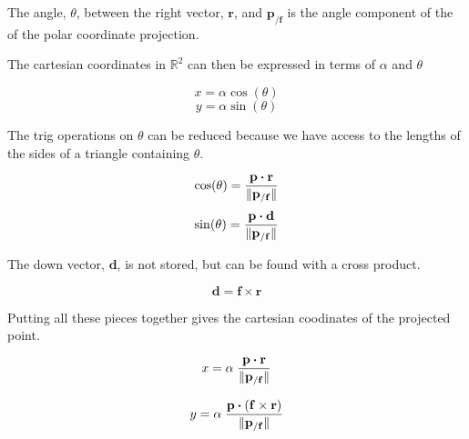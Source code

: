 \documentclass[twoside,12pt]{article}
\begin{document}
The angle, $\theta$, between the right vector, $\mathbf{r}$, and $\mathbf{p}_{/\mathbf{f}}$ is the angle component of the of the polar coordinate projection.


The cartesian coordinates in $\mathbb{R}^2$ can then be expressed in terms of $\alpha$ and $\theta$

\[ x = \alpha \cos ( \theta ) \]
\[ y = \alpha \sin ( \theta ) \]

The trig operations on $\theta$ can be reduced because we have access to the lengths of the sides of a triangle containing $\theta$.

\[ \cos ( \theta ) = \frac{ \mathbf{p} \boldsymbol{\cdot} \mathbf{r} }{ \| \mathbf{p}_{/\mathbf{f}} \| } \]
\[ \sin ( \theta ) = \frac{ \mathbf{p} \boldsymbol{\cdot} \mathbf{d} }{ \| \mathbf{p}_{/\mathbf{f}} \| } \]

The down vector, $\mathbf{d}$, is not stored, but can be found with a cross product.

\[ \mathbf{d} = \mathbf{f} \times \mathbf{r} \]

Putting all these pieces together gives the cartesian coodinates of the projected point.

\[ x = \alpha \; \frac{ \mathbf{p} \boldsymbol{\cdot} \mathbf{r} }{ \| \mathbf{p}_{/\mathbf{f}} \| } \]

\[ y = \alpha \; \frac{ \mathbf{p} \boldsymbol{\cdot} ( \mathbf{f} \times \mathbf{r} ) }{ \| \mathbf{p}_{/\mathbf{f}} \| } \]
\end{document}
